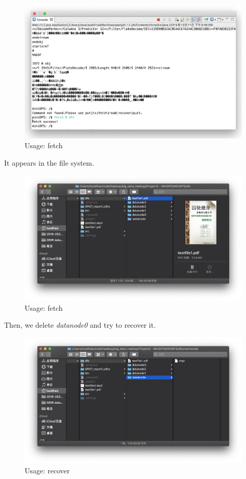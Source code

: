 \documentclass[10pt]{article}
\begin{document}
\begin{figure}[H]
\centerline{\includegraphics[width = 1\textwidth]{screenshot//fetch_01.png}}
\caption{Usage: fetch}
\end{figure}

It appears in the file system.

\begin{figure}[H]
\centerline{\includegraphics[width = 1\textwidth]{screenshot//fetch_02.png}}
\caption{Usage: fetch}
\end{figure}

Then, we delete \textit{datanode0} and try to recover it.

\begin{figure}[H]
\centerline{\includegraphics[width = 1\textwidth]{screenshot//recover_01.png}}
\caption{Usage: recover}
\end{figure}
\end{document}
